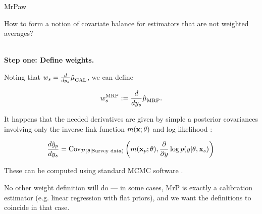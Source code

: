\begin{frame}[t]{MrPaw}

How to form a notion of covariate balance for estimators that are not weighted averages?



\vspace{1em}
\hrulefill\\
\textbf{Step one: Define weights.}

Noting that $w_s = \frac{d}{d y_s} \hat{\mu}^{}_{\mathrm{CAL}}$, we can define

$$
\wmrp_s := \frac{d}{d\y_s} \muhat_{\mrp}. %
$$

It happens that the needed derivatives are given
by simple a posterior covariances involving only the inverse
link function $m(\mathbf{x}; \theta)$ and
log likelihood \citep{giordano:2018:covariances}:

$$
\frac{d \hat{y}_p}{dy_s}  =
    \mathrm{Cov}_{\mathcal{P}(\theta \vert \textrm{Survey data})}\left( 
        m(\mathbf{x}_p; \theta),
        \frac{\partial}{\partial y} \log p(y \vert \theta, \mathbf{x}_s)\right)\,
$$

These can be computed using standard MCMC software \citep{brms}.

No other weight definition will do --- in some cases,
MrP is exactly a calibration estimator (e.g. linear regression with flat priors),
and we want the definitions to coincide in that case.

\end{frame}




